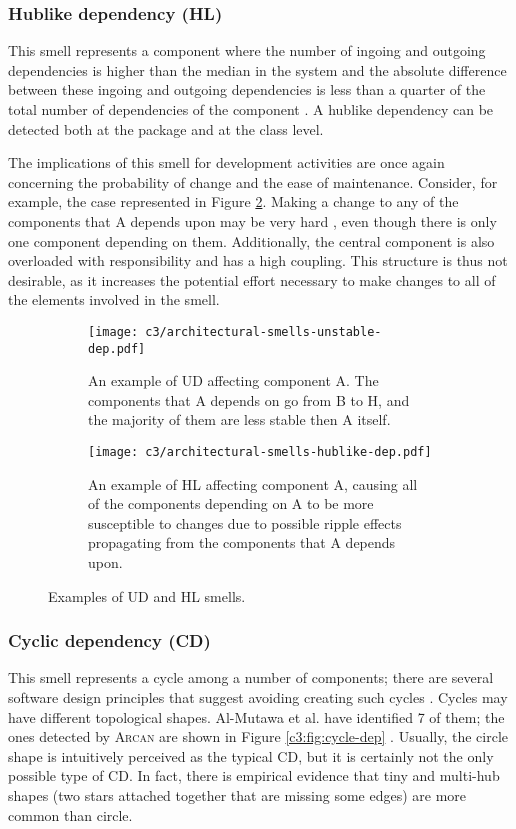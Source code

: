\subsubsection{Hublike dependency (HL)}\label{c3:sec:arch-smells-hl}
This smell represents a component where the number of ingoing and outgoing dependencies is higher than the median in the system and the absolute difference between these ingoing and outgoing dependencies is less than a quarter of the total number of dependencies of the component \cite{Arcelli2016}. A hublike dependency can be detected both at the package and at the class level.

The implications of this smell for development activities are once again concerning the probability of change and the ease of maintenance. Consider, for example, the case represented in Figure \ref{c3:fig:hublike-dep}.
Making a change to any of the components that A depends upon may be very hard \cite{Martin2018}, even though there is only one component depending on them.
Additionally, the central component is also overloaded with responsibility and has a high coupling.
This structure is thus not desirable, as it increases the potential effort necessary to make changes to all of the elements involved in the smell.
\begin{figure}
    \centering
	\begin{subfigure}[b]{0.85\linewidth}
		\centering
		\texttt{[image: c3/architectural-smells-unstable-dep.pdf]}
		\caption{An example of UD affecting component A. The components that A depends on go from B to H, and the majority of them are less stable then A itself.}\label{c3:fig:unstable-dep}
	\end{subfigure}
	\begin{subfigure}[b]{0.85\linewidth}
		\centering
		\texttt{[image: c3/architectural-smells-hublike-dep.pdf]}
		\caption{An example of HL affecting component A, causing all of the components depending on A to be more susceptible to changes due to possible ripple effects propagating from the components that A  depends upon.}\label{c3:fig:hublike-dep}
	\end{subfigure} 
    \caption{Examples of UD and HL smells.}
    \label{c3:fig:architectural smells} 
\end{figure}

\subsubsection{Cyclic dependency (CD)}\label{c3:sec:arch-smells-cd}
This smell represents a cycle among a number of components; there are several software design principles that suggest avoiding creating such cycles \cite{Lippert2006,Parnas1979,Stevens1974,Martin2018}.
Cycles may have different topological shapes. Al-Mutawa et al. \cite{AlMutawa2014} have identified 7 of them; the ones detected by \textsc{Arcan} are shown in Figure \ref{c3:fig:cycle-dep} \cite{Arcelli2017}.
Usually, the circle shape is intuitively perceived as the typical CD, but it is certainly not the only possible type of CD. In fact, there is empirical evidence \cite{AlMutawa2014} that tiny and multi-hub shapes (two stars attached together that are missing some edges) are more common than circle.

